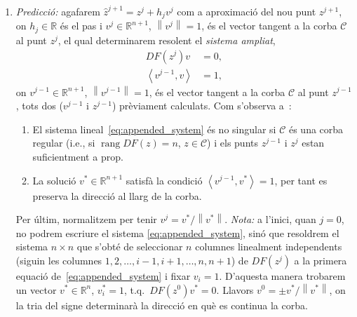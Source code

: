 \documentclass[11pt,reqno,twoside]{article}
\newcommand{\R}{\ensuremath{\mathbb{R}}}
\theoremstyle{remark}
\begin{document}
\begin{enumerate}[label = \emph{\arabic*.}]
  \item \emph{Predicció:} agafarem $\hat{z}^{j+1} = z^{j} + h_{j} v^{j}$ com a
  aproximació del nou punt $z^{j+1}$, on $h_{j}\in\R$ és el pas i
    $v^{j}\in\R^{n+1}$, $\left\|v^{j}\right\| = 1$,
    és el vector tangent a la corba $\mathcal{C}$ al punt $z^{j}$, el qual
    determinarem resolent el \emph{sistema ampliat},  
    \begin{equation}\label{eq:appended_system}
      \begin{split}
      DF\left(z^{j}\right)v &= 0,\\
      \left\langle v^{j-1}, v \right\rangle &= 1, 
    \end{split}
  \end{equation}
    on $v^{j-1}\in\R^{n+1}$, $\left\|v^{j-1}\right\|=1$, és el vector
    tangent a la corba $\mathcal{C}$ al punt $z^{j-1}$, tots dos ($v^{j-1}$
    i $z^{j-1}$) prèviament calculats. Com s'observa
    a~\cite{Kuznetsov2004}:
    \begin{enumerate}[label = (\roman*)] 
      \item El sistema lineal~\eqref{eq:appended_system} és no singular si
	$\mathcal{C}$ és una corba regular (i.e., si
	$\mathop{\mathrm{rang}} DF(z) = n$, $z\in\mathcal{C}$) i els punts
	$z^{j-1}$ i $z^{j}$ estan suficientment a prop.
      \item La solució $v^{\ast}\in\R^{n+1}$ satisfà la condició
	  $\left\langle v^{j-1}, v^{\ast}\right\rangle = 1$, per tant es preserva la
	  direcció al llarg de la corba.
     \end{enumerate}
     Per últim, normalitzem per tenir $v^{j} =
     v^{\ast}/\left\|v^{\ast}\right\|$. \emph{Nota:} a l'inici, quan $j =
     0$, no podrem
     escriure el sistema \eqref{eq:appended_system}, sinó que resoldrem el
     sistema $n\times n$ que s'obté de seleccionar $n$ columnes linealment
     independents
     (siguin les columnes $1,2,\dots,i-1,i+1,\dots,n,n+1$) de
     $DF(z^{j})$ a la primera equació 
     de~\eqref{eq:appended_system} i fixar 
     $v_{i} = 1$. D'aquesta manera trobarem un vector $v^{\ast}\in\R^{n}$, 
     $v^{\ast}_{i} = 1$, t.q.~$DF(z^{0})v^{\ast} = 0$. Llavors $v^{0} =
     \pm v^{\ast}/\left\|v^{\ast}\right\|$, on la tria del signe determinarà
     la direcció en què es continua la corba.


\end{enumerate}
\end{document}
